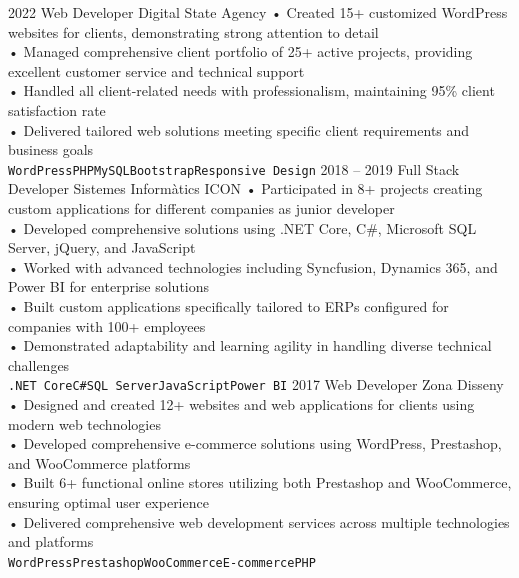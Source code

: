 \documentclass[9pt]{developercv} %
\begin{document}
\begin{entrylist}
	\entry
		{2022}
		{Web Developer}
		{Digital State Agency}
		{• Created 15+ customized WordPress websites for clients, demonstrating strong attention to detail\\
		• Managed comprehensive client portfolio of 25+ active projects, providing excellent customer service and technical support\\
		• Handled all client-related needs with professionalism, maintaining 95\% client satisfaction rate\\
		• Delivered tailored web solutions meeting specific client requirements and business goals\\ \texttt{WordPress}\slashsep\texttt{PHP}\slashsep\texttt{MySQL}\slashsep\texttt{Bootstrap}\slashsep\texttt{Responsive Design}}
	\entry
		{2018 -- 2019}
		{Full Stack Developer}
		{Sistemes Informàtics ICON}
		{• Participated in 8+ projects creating custom applications for different companies as junior developer\\
		• Developed comprehensive solutions using .NET Core, C\#, Microsoft SQL Server, jQuery, and JavaScript\\
		• Worked with advanced technologies including Syncfusion, Dynamics 365, and Power BI for enterprise solutions\\
		• Built custom applications specifically tailored to ERPs configured for companies with 100+ employees\\
		• Demonstrated adaptability and learning agility in handling diverse technical challenges\\ \texttt{.NET Core}\slashsep\texttt{C\#}\slashsep\texttt{SQL Server}\slashsep\texttt{JavaScript}\slashsep\texttt{Power BI}}
	\entry
		{2017}
		{Web Developer}
		{Zona Disseny}
		{• Designed and created 12+ websites and web applications for clients using modern web technologies\\
		• Developed comprehensive e-commerce solutions using WordPress, Prestashop, and WooCommerce platforms\\
		• Built 6+ functional online stores utilizing both Prestashop and WooCommerce, ensuring optimal user experience\\
		• Delivered comprehensive web development services across multiple technologies and platforms\\ \texttt{WordPress}\slashsep\texttt{Prestashop}\slashsep\texttt{WooCommerce}\slashsep\texttt{E-commerce}\slashsep\texttt{PHP}}
\end{entrylist}

\end{document}
